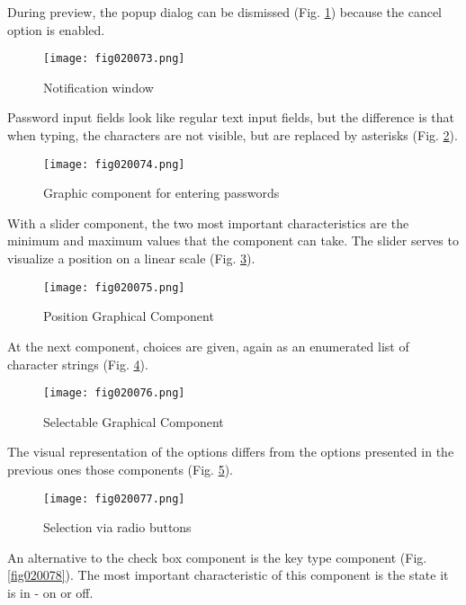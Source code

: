 During preview, the popup dialog can be dismissed (Fig. \ref{fig020073}) because the cancel option is enabled.

\begin{figure}[H]
   \centering
   \texttt{[image: fig020073.png]}
   \caption{Notification window}
\label{fig020073}
\end{figure}

Password input fields look like regular text input fields, but the difference is that when typing, the characters are not visible, but are replaced by asterisks (Fig. \ref{fig020074}).

\begin{figure}[H]
   \centering
   \texttt{[image: fig020074.png]}
   \caption{Graphic component for entering passwords}
\label{fig020074}
\end{figure}

With a slider component, the two most important characteristics are the minimum and maximum values that the component can take. The slider serves to visualize a position on a linear scale (Fig. \ref{fig020075}).

\begin{figure}[H]
   \centering
   \texttt{[image: fig020075.png]}
   \caption{Position Graphical Component}
\label{fig020075}
\end{figure}

At the next component, choices are given, again as an enumerated list of character strings (Fig. \ref{fig020076}).

\begin{figure}[H]
   \centering
   \texttt{[image: fig020076.png]}
   \caption{Selectable Graphical Component}
\label{fig020076}
\end{figure}

The visual representation of the options differs from the options presented in the previous ones those components (Fig. \ref{fig020077}).

\begin{figure}[H]
   \centering
   \texttt{[image: fig020077.png]}
   \caption{Selection via radio buttons}
\label{fig020077}
\end{figure}

An alternative to the check box component is the key type component (Fig. \ref{fig020078}). The most important characteristic of this component is the state it is in - on or off.

